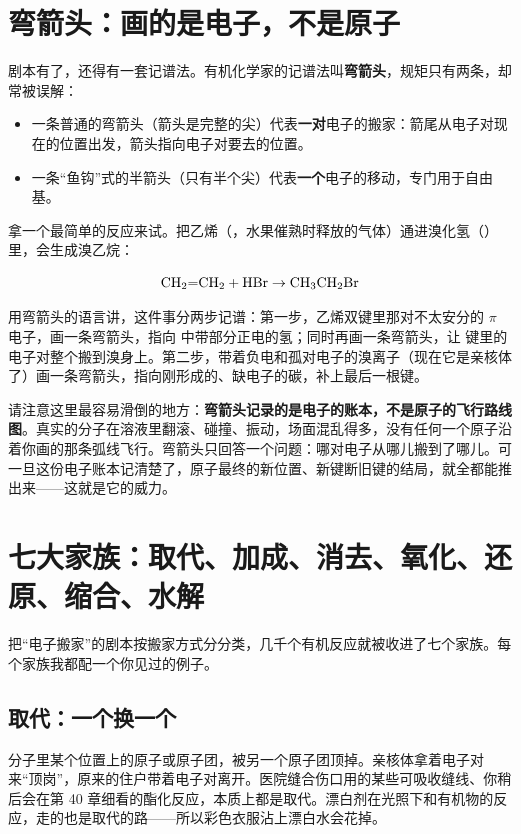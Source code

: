 \section{弯箭头：画的是电子，不是原子}

剧本有了，还得有一套记谱法。有机化学家的记谱法叫\textbf{弯箭头}，规矩只有两条，却常被误解：

\begin{itemize}[itemsep=2pt]
\item 一条普通的弯箭头（箭头是完整的尖）代表\textbf{一对}电子的搬家：箭尾从电子对现在的位置出发，箭头指向电子对要去的位置。
\item 一条“鱼钩”式的半箭头（只有半个尖）代表\textbf{一个}电子的移动，专门用于自由基。
\end{itemize}

拿一个最简单的反应来试。把乙烯（，水果催熟时释放的气体）通进溴化氢（）里，会生成溴乙烷：

\[\mathrm{CH_2{=}CH_2} + \mathrm{HBr} \rightarrow \mathrm{CH_3CH_2Br}\]

用弯箭头的语言讲，这件事分两步记谱：第一步，乙烯双键里那对不太安分的 $\pi$ 电子，画一条弯箭头，指向  中带部分正电的氢；同时再画一条弯箭头，让  键里的电子对整个搬到溴身上。第二步，带着负电和孤对电子的溴离子（现在它是亲核体了）画一条弯箭头，指向刚形成的、缺电子的碳，补上最后一根键。

请注意这里最容易滑倒的地方：\textbf{弯箭头记录的是电子的账本，不是原子的飞行路线图}。真实的分子在溶液里翻滚、碰撞、振动，场面混乱得多，没有任何一个原子沿着你画的那条弧线飞行。弯箭头只回答一个问题：哪对电子从哪儿搬到了哪儿。可一旦这份电子账本记清楚了，原子最终的新位置、新键断旧键的结局，就全都能推出来——这就是它的威力。

\section{七大家族：取代、加成、消去、氧化、还原、缩合、水解}

把“电子搬家”的剧本按搬家方式分分类，几千个有机反应就被收进了七个家族。每个家族我都配一个你见过的例子。

\subsection{取代：一个换一个}

分子里某个位置上的原子或原子团，被另一个原子团顶掉。亲核体拿着电子对来“顶岗”，原来的住户带着电子对离开。医院缝合伤口用的某些可吸收缝线、你稍后会在第 40 章细看的酯化反应，本质上都是取代。漂白剂在光照下和有机物的反应，走的也是取代的路——所以彩色衣服沾上漂白水会花掉。

